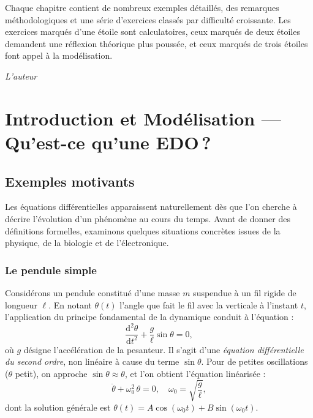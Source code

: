 \documentclass[12pt,a4paper,openany]{book}
\theoremstyle{definition}
\theoremstyle{plain}
\theoremstyle{remark}
\newcommand{\dd}{\mathrm{d}}
\begin{document}
Chaque chapitre contient de nombreux exemples détaillés, des remarques méthodologiques et une série d'exercices classés par difficulté croissante. Les exercices marqués d'une étoile sont calculatoires, ceux marqués de deux étoiles demandent une réflexion théorique plus poussée, et ceux marqués de trois étoiles font appel à la modélisation.

\vspace{1cm}
\hfill\textit{L'auteur}

\dominitoc
\tableofcontents

\chapter{Introduction et Modélisation --- Qu'est-ce qu'une EDO\,?}
\label{chap:introduction}

\section{Exemples motivants}
\label{sec:exemples-motivants}

Les équations différentielles apparaissent naturellement dès que l'on cherche à décrire l'évolution d'un phénomène au cours du temps. Avant de donner des définitions formelles, examinons quelques situations concrètes issues de la physique, de la biologie et de l'électronique.

\subsection{Le pendule simple}
\label{subsec:pendule}

Considérons un pendule constitué d'une masse $m$ suspendue à un fil rigide de longueur $\ell$. En notant $\theta(t)$ l'angle que fait le fil avec la verticale à l'instant $t$, l'application du principe fondamental de la dynamique conduit à l'équation :
\begin{equation}
\label{eq:pendule}
\frac{\dd^2\theta}{\dd t^2} + \frac{g}{\ell}\sin\theta = 0,
\end{equation}
où $g$ désigne l'accélération de la pesanteur. Il s'agit d'une \emph{équation différentielle du second ordre}, non linéaire à cause du terme $\sin\theta$. Pour de petites oscillations ($\theta$ petit), on approche $\sin\theta \approx \theta$, et l'on obtient l'équation linéarisée :
\begin{equation}
\label{eq:pendule-lineaire}
\ddot{\theta} + \omega_0^2\,\theta = 0, \quad \omega_0 = \sqrt{\frac{g}{\ell}},
\end{equation}
dont la solution générale est $\theta(t) = A\cos(\omega_0 t) + B\sin(\omega_0 t)$.
\end{document}
